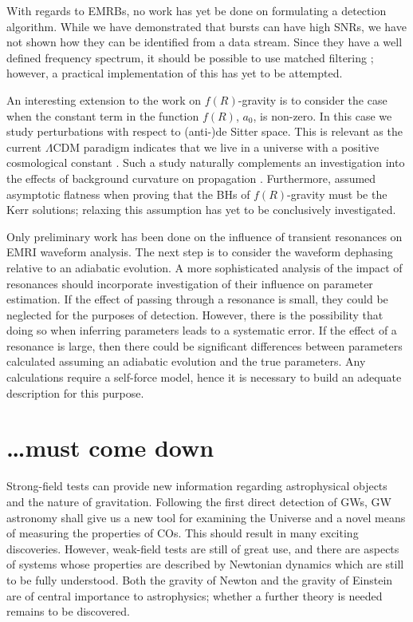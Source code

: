 With regards to EMRBs, no work has yet be done on formulating a detection algorithm. While we have demonstrated that bursts can have high SNRs, we have not shown how they can be identified from a data stream. Since they have a well defined frequency spectrum, it should be possible to use matched filtering \citep[cf.][]{Feroz2010}; however, a practical implementation of this has yet to be attempted.

An interesting extension to the work on $f(R)$-gravity is to consider the case when the constant term in the function $f(R)$, $a_0$, is non-zero. In this case we study perturbations with respect to (anti-)de Sitter space. This is relevant as the current $\Lambda$CDM paradigm indicates that we live in a universe with a positive cosmological constant \citep{Komatsu2011,Hinshaw2012,Ade2013b}. Such a study naturally complements an investigation into the effects of background curvature on propagation \citep{Yang2011}. Furthermore, \citet{Sotiriou2011} assumed asymptotic flatness when proving that the BHs of $f(R)$-gravity must be the Kerr solutions; relaxing this assumption has yet to be conclusively investigated.

Only preliminary work has been done on the influence of transient resonances on EMRI waveform analysis. The next step is to consider the waveform dephasing relative to an adiabatic evolution. A more sophisticated analysis of the impact of resonances should incorporate investigation of their influence on parameter estimation. If the effect of passing through a resonance is small, they could be neglected for the purposes of detection. However, there is the possibility that doing so when inferring parameters leads to a systematic error. If the effect of a resonance is large, then there could be significant differences between parameters calculated assuming an adiabatic evolution and the true parameters. Any calculations require a self-force model, hence it is necessary to build an adequate description for this purpose.

\section{\ldots must come down}

Strong-field tests can provide new information regarding astrophysical objects and the nature of gravitation. Following the first direct detection of GWs, GW astronomy shall give us a new tool for examining the Universe and a novel means of measuring the properties of COs. This should result in many exciting discoveries. However, weak-field tests are still of great use, and there are aspects of systems whose properties are described by Newtonian dynamics which are still to be fully understood. Both the gravity of Newton and the gravity of Einstein are of central importance to astrophysics; whether a further theory is needed remains to be discovered.